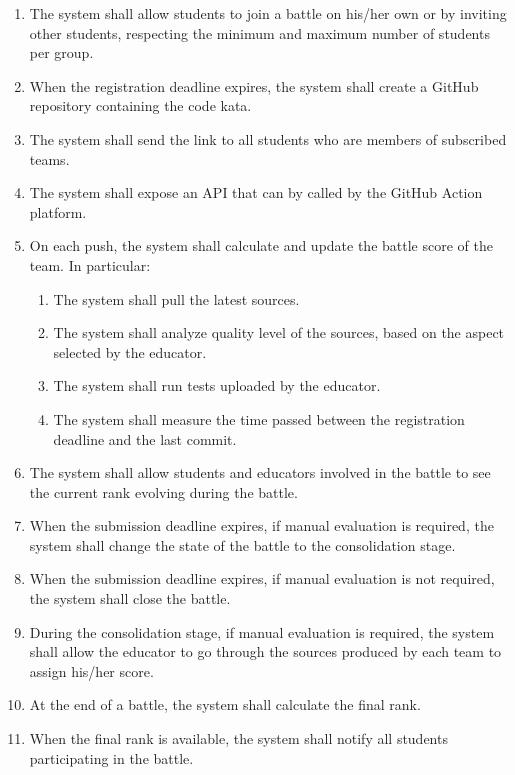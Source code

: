 \begin{enumerate}[label=\textbf{R\arabic*}:,leftmargin=1.3cm]
\begin{enumerate}[label=\textbf{R\arabic{enumi}.\arabic*}:, leftmargin=*]
          \end{enumerate}
    \item The system shall allow students to join a battle on his/her own or by inviting other students, respecting the minimum and maximum number of students per group.
    \item When the registration deadline expires, the system shall create a GitHub repository containing the code kata.
    \item The system shall send the link to all students who are members of subscribed teams.
    \item The system shall expose an API that can by called by the GitHub Action platform.
    \item On each push, the system shall calculate and update the battle score of the team. In particular: 
          \begin{enumerate}[label=\textbf{R\arabic{enumi}.\arabic*}:, leftmargin=*]
              \item The system shall pull the latest sources.
              \item The system shall analyze quality level of the sources, based on the aspect selected by the educator.
              \item The system shall run tests uploaded by the educator.
              \item The system shall measure the time passed between the registration deadline and the last commit.
          \end{enumerate}
    \item The system shall allow students and educators involved in the battle to see the current rank evolving during the battle.
    \item When the submission deadline expires, if manual evaluation is required, the system shall change the state of the battle to the consolidation stage.
    \item When the submission deadline expires, if manual evaluation is not required, the system shall close the battle.
    \item During the consolidation stage, if manual evaluation is required, the system shall allow the educator to go through the sources produced by each team to assign his/her score.
    \item At the end of a battle, the system shall calculate the final rank.
    \item When the final rank is available, the system shall notify all students participating in the battle.

\end{enumerate}
